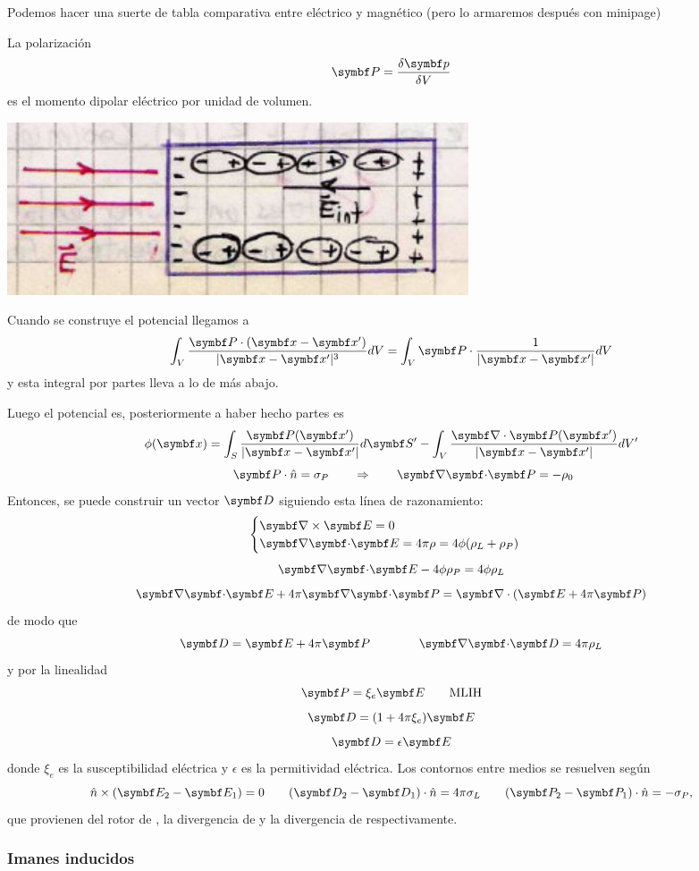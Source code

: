 \documentclass[10pt,oneside]{CBFT_book}
\begin{document}
Podemos hacer una suerte de tabla comparativa entre eléctrico y magnético
(pero lo armaremos después con minipage)

La polarización  
\[
	\vb{P} = \frac{\delta \vb{p}}{\delta V}
\]
es el momento dipolar eléctrico por unidad de volumen. 

\includegraphics[width=0.6\textwidth]{images/fig_ft1_medios_picturete.jpg}	



Cuando se construye el potencial llegamos a 
\[
	\int_V \frac{\vb{P}\cdot ( \vbx - \vbx')}{|\vb{x}-\vb{x}'|^3} dV =
	\int_V \vb{P}\cdot \frac{ 1 }{ |\vb{x}-\vb{x}'| } dV 
\]
y esta integral por partes lleva a lo de más abajo.


Luego el potencial es, posteriormente a haber hecho partes
es
\[
	\phi( \vb{x}) = \int_S \frac{\vb{P}(\vb{x}')}{|\vb{x}-\vb{x}'|} d\vb{S}' - 
	\int_V \frac{\Nabla\cdot\vb{P}(\vb{x}')}{|\vb{x}-\vb{x}'|}  dV'
\]
\[
	\qquad \vb{P}\cdot\hat{n} = \sigma_P \qquad \Rightarrow \qquad \divem{P} = -\rho_0
\]
Entonces, se puede construir un vector $\vb{D}$ siguiendo
esta línea de razonamiento:
\[
	\begin{cases}
	\rotorm{E}  = 0 \\
	\divem{E} = 4\pi\rho = 4\phi( \rho_L + \rho_P )
	\end{cases}
\]
\[
	\divem{E} -  4\phi\rho_P = 4\phi\rho_L 
\]
\[
	\divem{E} + 4 \pi \divem{P} = \Nabla\cdot(\vb{E} + 4\pi\vb{P} )
\]
de modo que
\[
	\vb{D} = \vb{E} + 4 \pi \vb{P} \qquad \qquad \divem{D} = 4\pi\rho_L
\]
y por la linealidad
\[
	\vb{P} = \xi_e \vb{E} \qquad \text{MLIH}
\]
\[
	\vb{D} = ( 1 + 4\pi\xi_e ) \vb{E} 
\]
\[
	\vb{D} = \epsilon \vb{E}
\]
donde $\xi_e$ es la susceptibilidad eléctrica y $\epsilon$ es la permitividad eléctrica.
Los contornos entre medios se resuelven según
\[
	\hat{n} \times (\vb{E}_2 -\vb{E}_1) = 0 \qquad 
	(\vb{D}_2 -\vb{D}_1)\cdot\hat{n} = 4 \pi \sigma_L \qquad 
	(\vb{P}_2 -\vb{P}_1)\cdot\hat{n} = - \sigma_P,
\]
que provienen del rotor de , la divergencia de  y la divergencia
de  respectivamente.

\subsubsection{Imanes inducidos}
\end{document}
